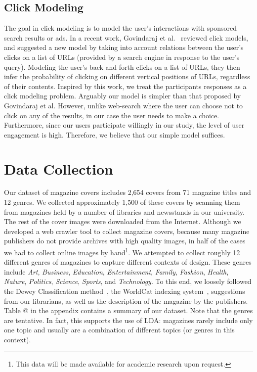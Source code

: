 \documentclass[prodmode,acmtochi]{acmsmall}
\makeatletter
\newcommand{\Rmnum}[1]{\expandafter\@slowromancap\romannumeral #1@}
\makeatother
\begin{document}
\subsection{Click Modeling}

The goal in click modeling is to model the user's interactions with
sponsored search results or ads.  In a recent work, Govindaraj et
al.~\cite{govindaraj2014modeling} reviewed click models, and suggested a
new model by taking into account relations between the user's clicks on
a list of URLs (provided by a search engine in response to the user's
query).  Modeling the user's back and forth clicks on a list of URLs,
they then infer the probability of clicking on different vertical
positions of URLs, regardless of their contents.  Inspired by this work,
we treat the participants responses as a click modeling problem.
Arguably our model is simpler than that proposed by Govindaraj et al. However, unlike web-search where the user can choose not to click on
any of the results, in our case the user needs to make a
choice. Furthermore, since our users participate willingly in our study, the level of user engagement is high. Therefore, we believe
that our simple model suffices.

\section{Data Collection}
\label{sec:DataCollection}

Our dataset of magazine covers includes 2,654 covers from 71 magazine
titles and 12 genres.  We collected approximately 1,500 of these covers by scanning
them from magazines held by a number of libraries and newsstands in our
university.  The rest of the cover images were downloaded from the
Internet.  Although we developed a web crawler tool to collect magazine
covers, because many magazine publishers do not provide archives with
high quality images, in half of the cases we had to collect online
images by hand\footnote{This data will be made available for academic research
upon request.}. We attempted to collect roughly 12 different genres of magazines to capture different contexts of design.  These genres include \emph{Art}, \emph{Business}, \emph{Education}, \emph{Entertainment}, \emph{Family}, \emph{Fashion}, \emph{Health}, \emph{Nature}, \emph{Politics}, \emph{Science}, \emph{Sports}, and \emph{Technology}. To this
end, we loosely followed the Dewey Classification method~\cite{Dewey}, the WorldCat indexing system~\cite{worldcat},
suggestions from our librarians, as well as the description of the
magazine by the publishers.  Table \Rmnum{1} in the appendix contains a summary of our dataset.  Note that the genres are tentative.
In fact, this supports the use of LDA: magazines rarely include only one
topic and usually are a combination of different topics (or genres in
this context).
\end{document}
